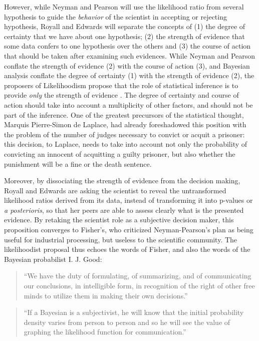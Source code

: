 \documentclass[twoside,12pt,a4paper]{article}
\begin{document}
However, while Neyman and Pearson will use the likelihood ratio from several hypothesis to guide the 
{\em behavior} of the scientist in accepting or rejecting hypothesis, Royall and Edwards will separate
the concepts of (1) the degree of certainty that we have about one hypothesis; (2) the strength of evidence
that some data confers to one hypothesis over the others and (3) the course of action that should be taken
after examining such evidences. While Neyman and Pearson conflate the strength of evidence (2) with the
course of action (3), and Bayesian analysis conflate the degree of certainty (1) with the strength of 
evidence (2), the proposers of Likelihoodism propose that the role of statistical inference is to provide
{\em only} the strength of evidence \citep{Royall97}. 
The degree of certainty and course of action should take into account
a multiplicity of other factors, and should not be part of the inference. One of the greatest precursors 
of the statistical thought, Marquis Pierre-Simon de Laplace, had already foreshadowed this position with
the problem of the number of judges necessary to convict or acquit a prisoner: this decision, to Laplace,
needs to take into account not only the probability of convicting an innocent of acquitting a guilty 
prisoner, but also whether the punishment will be a fine or the death sentence\citep{Laplace1814}.

Moreover, by dissociating the strength of evidence from the decision making, Royall and Edwards are asking
the scientist to reveal the untransformed likelihood ratios derived from its data, instead of transforming
it into p-values or {\em a posterioris}, so that her peers are able to assess clearly what is the presented
evidence. By retaking the scientist role as a subjective decision maker, this proposition converges to
Fisher's, who criticized Neyman-Pearson's plan as being useful for industrial processing, but useless
to the scientific community. The likelihoodist proposal thus echoes the words of Fisher, and also the words
of the Bayesian probabilist I. J. Good:

\begin{quote}
``We have the duty of formulating, of summarizing, and of communicating our conclusions, in intelligible form, in
recognition of the right of other free minds to utilize them in making their own decisions.'' 
\citep{Fisher1955}
\end{quote}

\begin{quote}
``If a Bayesian is a subjectivist, he will know that the initial probability density varies from person to person and
so he will see the value of graphing the likelihood function for communication.'' \citep{Good76}
\end{quote}
\end{document}
